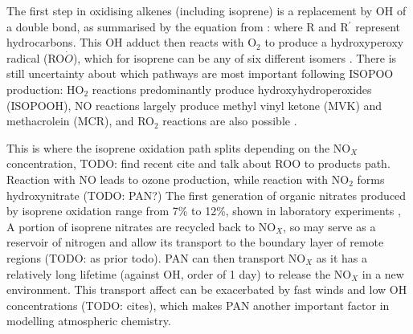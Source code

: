       The first step in oxidising alkenes (including isoprene) is a replacement by OH of a double bond, as summarised by the equation from \cite{Patchen2007}:
      where R and R$^{\prime}$ represent hydrocarbons.
      This OH adduct then reacts with O$_2$ to produce a hydroxyperoxy radical (RO$\dot{O}$), which for isoprene can be any of six different isomers \citep{Patchen2007}.
      There is still uncertainty about which pathways are most important following ISOPOO production: HO$_2$ reactions predominantly produce hydroxyhydroperoxides (ISOPOOH), NO reactions largely produce methyl vinyl ketone (MVK) and methacrolein (MCR), and RO$_2$ reactions are also possible \cite{Liu2016a}.
      
      This is where the isoprene oxidation path splits depending on the NO$_X$ concentration, TODO: find recent cite and talk about ROO to products path.
      Reaction with NO leads to ozone production, while reaction with NO$_2$ forms hydroxynitrate (TODO: PAN?)
      The first generation of organic nitrates produced by isoprene oxidation range from 7\% to 12\%, shown in laboratory experiments \citep{Paulot2009a, Mao2013},
      A portion of isoprene nitrates are recycled back to NO$_X$, so may serve as a reservoir of nitrogen and allow its transport to the boundary layer of remote regions (TODO: as prior todo)\citep{Patchen2007,Paulot2009a}.
      PAN can then transport NO$_X$ as it has a relatively long lifetime (against OH, order of 1 day) to release the NO$_X$ in a new environment.
      This transport affect can be exacerbated by fast winds and low OH concentrations (TODO: cites), which makes PAN another important factor in modelling atmospheric chemistry.
      

